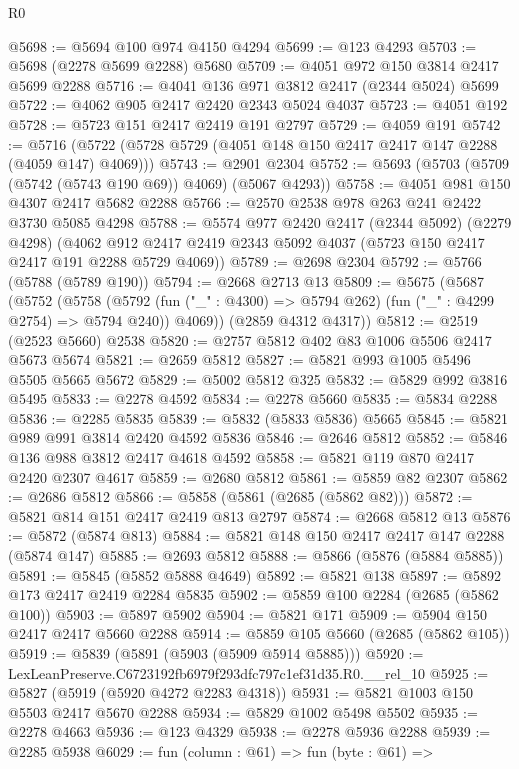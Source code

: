 \begin{lexlean}{R0}
\begin{coremodule}
@5698 := @5694 @100 @974 @4150 @4294
@5699 := @123 @4293
@5703 := @5698 (@2278 @5699 @2288) @5680
@5709 := @4051 @972 @150 @3814 @2417 @5699 @2288
@5716 := @4041 @136 @971 @3812 @2417 (@2344 @5024) @5699
@5722 := @4062 @905 @2417 @2420 @2343 @5024 @4037
@5723 := @4051 @192
@5728 := @5723 @151 @2417 @2419 @191 @2797
@5729 := @4059 @191
@5742 := @5716 (@5722 (@5728 @5729 (@4051 @148 @150 @2417 @2417 @147 @2288 (@4059 @147) @4069)))
@5743 := @2901 @2304
@5752 := @5693 (@5703 (@5709 (@5742 (@5743 @190 @69)) @4069) (@5067 @4293))
@5758 := @4051 @981 @150 @4307 @2417 @5682 @2288
@5766 := @2570 @2538 @978 @263 @241 @2422 @3730 @5085 @4298
@5788 := @5574
    @977
    @2420
    @2417
    (@2344 @5092)
    (@2279 @4298)
    (@4062 @912 @2417 @2419 @2343 @5092 @4037 (@5723 @150 @2417 @2417 @191 @2288 @5729 @4069))
@5789 := @2698 @2304
@5792 := @5766 (@5788 (@5789 @190))
@5794 := @2668 @2713 @13
@5809 := @5675
    (@5687
      (@5752
        (@5758
          (@5792 (fun ("_" : @4300) => @5794 @262) (fun ("_" : @4299 @2754) => @5794 @240))
          @4069))
      (@2859 @4312 @4317))
@5812 := @2519 (@2523 @5660) @2538
@5820 := @2757 @5812 @402 @83 @1006 @5506 @2417 @5673 @5674
@5821 := @2659 @5812
@5827 := @5821 @993 @1005 @5496 @5505 @5665 @5672
@5829 := @5002 @5812 @325
@5832 := @5829 @992 @3816 @5495
@5833 := @2278 @4592
@5834 := @2278 @5660
@5835 := @5834 @2288
@5836 := @2285 @5835
@5839 := @5832 (@5833 @5836) @5665
@5845 := @5821 @989 @991 @3814 @2420 @4592 @5836
@5846 := @2646 @5812
@5852 := @5846 @136 @988 @3812 @2417 @4618 @4592
@5858 := @5821 @119 @870 @2417 @2420 @2307 @4617
@5859 := @2680 @5812
@5861 := @5859 @82 @2307
@5862 := @2686 @5812
@5866 := @5858 (@5861 (@2685 (@5862 @82)))
@5872 := @5821 @814 @151 @2417 @2419 @813 @2797
@5874 := @2668 @5812 @13
@5876 := @5872 (@5874 @813)
@5884 := @5821 @148 @150 @2417 @2417 @147 @2288 (@5874 @147)
@5885 := @2693 @5812
@5888 := @5866 (@5876 (@5884 @5885))
@5891 := @5845 (@5852 @5888 @4649)
@5892 := @5821 @138
@5897 := @5892 @173 @2417 @2419 @2284 @5835
@5902 := @5859 @100 @2284 (@2685 (@5862 @100))
@5903 := @5897 @5902
@5904 := @5821 @171
@5909 := @5904 @150 @2417 @2417 @5660 @2288
@5914 := @5859 @105 @5660 (@2685 (@5862 @105))
@5919 := @5839 (@5891 (@5903 (@5909 @5914 @5885)))
@5920 := LexLeanPreserve.C6723192fb6979f293dfc797c1ef31d35.R0.__rel_10
@5925 := @5827 (@5919 (@5920 @4272 @2283 @4318))
@5931 := @5821 @1003 @150 @5503 @2417 @5670 @2288
@5934 := @5829 @1002 @5498 @5502
@5935 := @2278 @4663
@5936 := @123 @4329
@5938 := @2278 @5936 @2288
@5939 := @2285 @5938
@6029 := fun (column : @61) =>
  fun (byte : @61) =>

\end{coremodule}
\end{lexlean}
